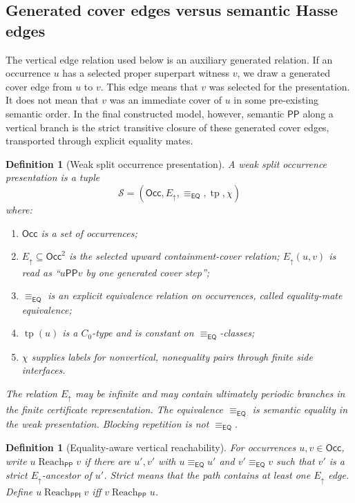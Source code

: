 \documentclass[11pt]{article}
\newtheorem{definition}[theorem]{Definition}
\newcommand{\EQ}{\mathsf{EQ}}
\newcommand{\PP}{\mathsf{PP}}
\newcommand{\PPI}{\mathsf{PPI}}
\newcommand{\Occ}{\mathsf{Occ}}
\newcommand{\typ}{\operatorname{tp}}
\newcommand{\eqc}{\equiv_{\EQ}}
\newcommand{\reach}{\operatorname{Reach}}
\begin{document}
\subsection{Generated cover edges versus semantic Hasse edges}

The vertical edge relation used below is an auxiliary generated relation.  If an occurrence $u$ has a selected proper superpart witness $v$, we draw a generated cover edge from $u$ to $v$.  This edge means that $v$ was selected for the presentation.  It does not mean that $v$ was an immediate cover of $u$ in some pre-existing semantic order.  In the final constructed model, however, semantic $\PP$ along a vertical branch is the strict transitive closure of these generated cover edges, transported through explicit equality mates.

\begin{definition}[Weak split occurrence presentation]\label{def:weak-presentation}
A weak split occurrence presentation is a tuple
\[
  \mathcal S=(\Occ,E_\uparrow,\eqc,\typ,\chi)
\]
where:
\begin{enumerate}[label=(S\arabic*)]
\item $\Occ$ is a set of occurrences;
\item $E_\uparrow\subseteq\Occ^2$ is the selected upward containment-cover relation; $E_\uparrow(u,v)$ is read as ``$u\PP v$ by one generated cover step'';
\item $\eqc$ is an explicit equivalence relation on occurrences, called equality-mate equivalence;
\item $\typ(u)$ is a $C_0$-type and is constant on $\eqc$-classes;
\item $\chi$ supplies labels for nonvertical, nonequality pairs through finite side interfaces.
\end{enumerate}
The relation $E_\uparrow$ may be infinite and may contain ultimately periodic branches in the finite certificate representation.  The equivalence $\eqc$ is semantic equality in the weak presentation.  Blocking repetition is not $\eqc$.
\end{definition}

\begin{definition}[Equality-aware vertical reachability]\label{def:eq-aware-vertical}
For occurrences $u,v\in\Occ$, write $u\reach_\PP v$ if there are $u',v'$ with $u\eqc u'$ and $v'\eqc v$ such that $v'$ is a strict $E_\uparrow$-ancestor of $u'$.  Strict means that the path contains at least one $E_\uparrow$ edge.  Define $u\reach_\PPI v$ iff $v\reach_\PP u$.
\end{definition}
\end{document}
